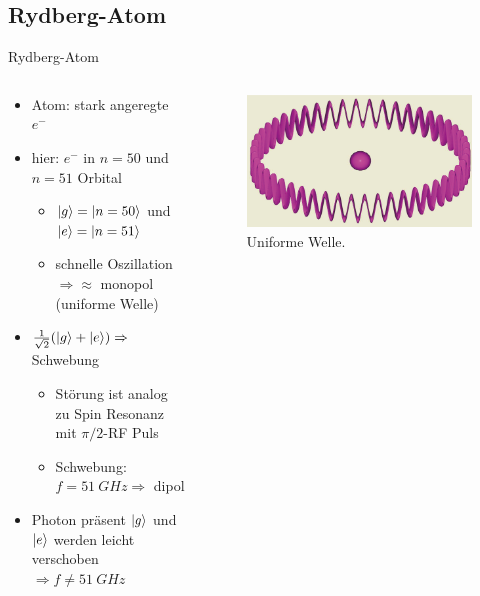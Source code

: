 \documentclass{beamer}
\begin{document}
\subsection{Rydberg-Atom}
\begin{frame}{Rydberg-Atom}
	\begin{columns}
		\begin{column}{0.5\textwidth}
			\begin{itemize}
				\item Atom: stark angeregte $e^-$
				\item hier: $e^-$ in $n=50$ und $n=51$ Orbital
				      \begin{itemize}
					      \item $\ket{g}=\ket{n=50}$ und $\ket{e}=\ket{n=51}$
					      \item schnelle Oszillation\\$\Rightarrow\approx$ monopol (uniforme Welle)
				      \end{itemize}
				\item $\frac{1}{\sqrt{2}}(\ket{g}+\ket{e})\Rightarrow$ Schwebung
				      \begin{itemize}
					      \item Störung ist analog zu Spin Resonanz mit $\pi/2$-RF Puls
					      \item Schwebung: $f=\SI{51}{GHz}\Rightarrow$ dipol
				      \end{itemize}
				\item Photon präsent $\ket{g}$ und $\ket{e}$ werden leicht verschoben $\Rightarrow f\neq\SI{51}{GHz}$
			\end{itemize}
		\end{column}
		\begin{column}{0.5\textwidth}
			\begin{figure}
				\center\includegraphics[width=.75\textwidth]{images/uniwave.png}
				\caption{Uniforme Welle\cite{lect}.}
			\end{figure}
			\begin{figure}

\end{figure}
\end{column}
\end{columns}
\end{frame}
\end{document}

